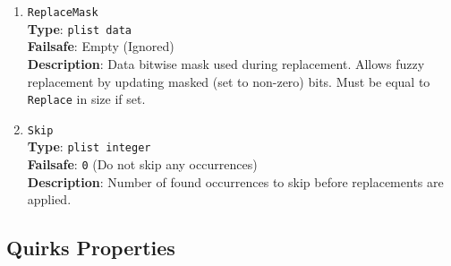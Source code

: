 \documentclass[]{article}
\begin{document}
\begin{enumerate}
\item
  \texttt{ReplaceMask}\\
  \textbf{Type}: \texttt{plist\ data}\\
  \textbf{Failsafe}: Empty (Ignored)\\
  \textbf{Description}: Data bitwise mask used during replacement.
  Allows fuzzy replacement by updating masked (set to non-zero) bits.
  Must be equal to \texttt{Replace} in size if set.

\item
  \texttt{Skip}\\
  \textbf{Type}: \texttt{plist\ integer}\\
  \textbf{Failsafe}: \texttt{0} (Do not skip any occurrences)\\
  \textbf{Description}: Number of found occurrences to skip before
  replacements are applied.

\end{enumerate}

\subsection{Quirks Properties}\label{kernelpropsquirks}
\end{document}
